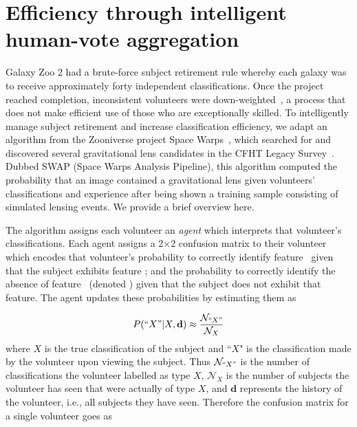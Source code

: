 \section{Efficiency through intelligent human-vote aggregation}\label{chap3: SWAP}

Galaxy Zoo 2 had a brute-force subject retirement rule whereby each galaxy was to receive approximately forty independent classifications.  Once the project reached completion, inconsistent volunteers were down-weighted~\citep{Willett2013}, a process that does not make efficient use of those who are exceptionally skilled. To intelligently manage subject retirement and increase classification efficiency, we adapt an algorithm from the Zooniverse  project Space Warps~\citep{Marshall2016}, which searched for and discovered several gravitational lens candidates in the CFHT Legacy Survey~\citep{More2016}.  Dubbed SWAP (Space Warps Analysis Pipeline), this algorithm computed the probability that an image contained a gravitational lens given volunteers' classifications and experience after being shown a training sample consisting of simulated lensing events.  We provide a brief overview here.  

The algorithm assigns each volunteer an \textit{agent} which interprets that volunteer's classifications. Each agent assigns a 2$\times$2 confusion matrix to their volunteer which encodes that volunteer's probability to correctly identify feature \A~given that the subject exhibits feature \A; and the probability to correctly identify the absence of feature \A~(denoted \N) given that the subject does not exhibit that feature. The agent updates these probabilities by estimating them as 

\begin{equation}
P(``X" | X, \mathbf{d}) \approx \frac{\mathcal{N}_{``X"}}{\mathcal{N}_{X}}
\end{equation}
where $X$ is the true classification of the subject and ``$X$" is the  classification made by the volunteer upon viewing the subject. Thus $\mathcal{N}_{``X"}$ is the number of classifications the volunteer labelled as type $X$, $\mathcal{N}_X$ is the number of subjects the volunteer has seen that were actually of type $X$, and $\mathbf{d}$ represents the history of the volunteer, i.e., all subjects they have seen. Therefore the confusion matrix for a single volunteer goes as


